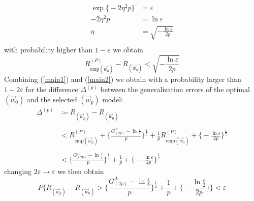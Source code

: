 \begin{equation}
	\begin{array}{rl}
	\exp\big\{ -2 \eta^2 p \big\} & = \varepsilon \\
	-2 \eta^2 p & = \ln \varepsilon \\
	\eta & = \sqrt{-\frac{\ln \varepsilon}{2p}} \\
	\end{array}
\end{equation}
with probability higher than $1 - \varepsilon$ we obtain
\begin{equation} \label{main2}
	R_{ \mathrm{ emp } ( \vec{w}_0 ) }^{ (P) } -
	R_{ ( \vec{w}_0 ) }
		< \sqrt{-\frac{\ln \varepsilon}{2p}} 
\end{equation}
Combining (\ref{main1}) and (\ref{main2}) we obtain with a probability larger than $1 - 2\varepsilon$ for the difference $\Delta^{(p)}$ between the generalization errors of the optimal $(\vec{w}_0)$ and the selected $(\vec{w}_p)$ model:
\begin{equation}
	\begin{array}{ll}
		\Delta^{(p)}
		& \coloneqq R_{ ( \vec{w}_p ) } -
			R_{ ( \vec{w}_0 ) } \\\\
		& < R_{ \mathrm{ emp } 
			( \vec{w}_p ) }^{ (P) } 
		+ \Bigg\{ \frac{ G_{ (2p) }^\Lambda 
			-\ln \frac{\varepsilon}{4} }{p}
		\Bigg\}^{ \frac{1}{2} } + \frac{1}{p}
			R_{ \mathrm{ emp } 
			( \vec{w}_0 ) }^{ (P) } 
		+ \Big\{ -\frac{\ln \varepsilon}{2p} \Big\}^{\frac{1}{2}} \\\\
		& < \Bigg\{ \frac{ G_{ (2p) }^\Lambda 
			-\ln \frac{\varepsilon}{4} }{p}
		\Bigg\}^{ \frac{1}{2} } + \frac{1}{p}
		+ \Big\{ -\frac{\ln \varepsilon}{2p} \Big\}^{\frac{1}{2}}
	\end{array}
\end{equation}
changing $2 \varepsilon \rightarrow \varepsilon$ we then obtain
\begin{equation}
	P\Bigg\{ R_{ ( \vec{w}_p ) } - 
		R_{ ( \vec{w}_0 ) } >
		\Bigg\{ \frac{ G_{ (2p) }^\Lambda 
			-\ln \frac{\varepsilon}{8} }{p}
		\Bigg\}^{ \frac{1}{2} } + \frac{1}{p}
		+ \Bigg\{ -\frac{\ln \frac{\varepsilon}{2}}{2p}
		\Bigg\}
	\Bigg\} < \varepsilon
\end{equation}
